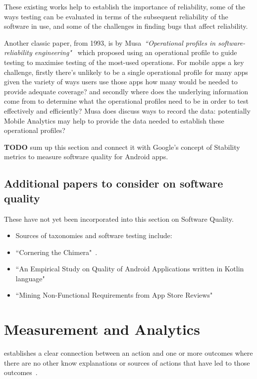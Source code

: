 These existing works help to establish the importance of reliability, some of the ways testing can be evaluated in terms of the subsequent reliability of the software in use, and some of the challenges in finding bugs that affect reliability. 

Another classic paper, from 1993, is by Musa~\emph{``Operational profiles in software-reliability engineering"}~\cite{musa1993_operational_profiles} which proposed using an operational profile to guide testing to maximise testing of the most-used operations. For mobile apps a key challenge, firstly there's unlikely to be a single operational profile for many apps given the variety of ways users use those apps how many would be needed to provide adequate coverage? and secondly where does the underlying information come from to determine what the operational profiles need to be in order to test effectively and efficiently? Musa does discuss ways to record the data: potentially Mobile Analytics may help to provide the data needed to establish these operational profiles? 

\textbf{TODO} sum up this section and connect it with Google's concept of Stability metrics to measure software quality for Android apps.

\subsection{Additional papers to consider on software quality}
These have not yet been incorporated into this section on Software Quality.
\begin{itemize}
    \item Sources of taxonomies and software testing include:~\cite{foidl2018_integrating_software_quality_models_into_risk_based_testing} 
    \item ``Cornering the Chimera"~\cite{dromey1996_cornering_the_chimera}.
    \item ``An Empirical Study on Quality of Android Applications written in Kotlin language"
    \item ``Mining Non-Functional Requirements from App Store Reviews"

\end{itemize}

\section{Measurement and Analytics}
 establishes a clear connection between an action and one or more outcomes where there are no other know explanations or sources of actions that have led to those outcomes~\citep[pp. 260-266]{mill1884system}.

